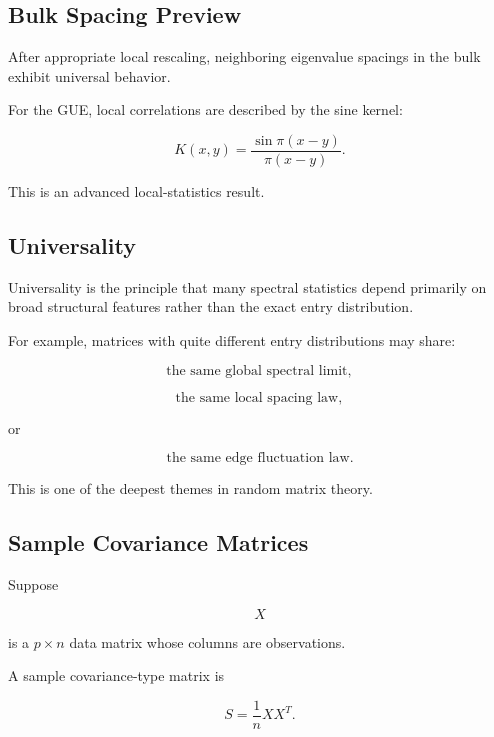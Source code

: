 \subsection{Bulk Spacing Preview}
\label{subsec:bulk-spacing-preview}

After appropriate local rescaling, neighboring eigenvalue spacings in
the bulk exhibit universal behavior.

For the GUE, local correlations are described by the sine kernel:

\[
\boxed{
K(x,y)
=
\frac{
\sin\pi(x-y)
}{
\pi(x-y)
}.
}
\]

This is an advanced local-statistics result.

\subsection{Universality}
\label{subsec:random-matrix-universality}

Universality is the principle that many spectral statistics depend
primarily on broad structural features rather than the exact entry
distribution.

For example, matrices with quite different entry distributions may
share:

\[
\boxed{
\text{the same global spectral limit},
}
\]

\[
\boxed{
\text{the same local spacing law},
}
\]

or

\[
\boxed{
\text{the same edge fluctuation law}.
}
\]

This is one of the deepest themes in random matrix theory.

\subsection{Sample Covariance Matrices}
\label{subsec:sample-covariance-random-matrix}

Suppose

\[
X
\]

is a \(p\times n\) data matrix whose columns are observations.

A sample covariance-type matrix is

\[
\boxed{
S
=
\frac1n
XX^T.
}
\]

